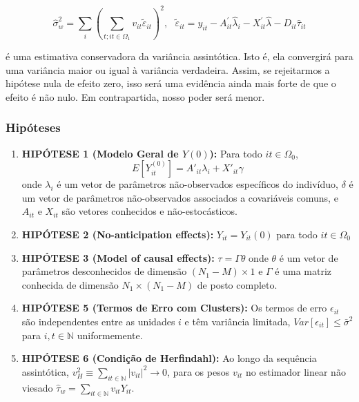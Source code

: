 \documentclass[portugues]{article}
\begin{document}
\begin{equation}\label{eq:var_borusyak}
    \hat{\sigma}_w^2 = \sum_{i} \left( \sum_{t;it \in \Omega_1} v_{it} \tilde{\varepsilon}_{it} \right)^2, \text{ } \tilde{\varepsilon}_{it} = y_{it} - A_{it}^\prime \hat{\lambda}_i - X_{it}^\prime \hat{\lambda} - D_{it} \hat{\tau}_{it}
\end{equation}

\noindent  é uma estimativa conservadora da variância assintótica. Isto é, ela convergirá para uma variância maior ou igual à variância verdadeira. Assim, se rejeitarmos a hipótese nula de efeito zero, isso será uma evidência ainda mais forte de que o efeito é não nulo. Em contrapartida, nosso poder será menor. 


\subsubsection{Hipóteses}

\begin{boxB}
    \begin{enumerate}

    \item \textbf{HIPÓTESE 1 (Modelo Geral de $Y(0)$):} Para todo $it \in \Omega_0$,
    $$E\left[Y_{it}^{(0)}\right] = A'_{it} \lambda_i + X'_{it} \gamma$$
    \noindent onde $\lambda_i$ é um vetor de parâmetros não-observados específicos do indivíduo, $\delta$ é um vetor de parâmetros não-observados associados a covariáveis comuns, e $A_{it}$ e $X_{it}$ são vetores conhecidos e não-estocásticos.

    \item \textbf{HIPÓTESE 2 (No-anticipation effects):} $Y_{it} = Y_{it}(0)$ para todo $it \in \Omega_0$

    \item \textbf{HIPÓTESE 3 (Model of causal effects):} $\tau = \Gamma\theta$ onde $\theta$ é um vetor de parâmetros desconhecidos de dimensão $(N_1 - M) \times 1$ e $\Gamma$ é uma matriz conhecida de dimensão $N_1 \times (N_1 - M)$ de posto completo.
   
    \item \textbf{HIPÓTESE 5 (Termos de Erro com Clusters):} Os termos de erro $\epsilon_{it}$ são independentes entre as unidades $i$ e têm variância limitada, $Var[\epsilon_{it}] \leq \bar{\sigma}^2$ para $i,t \in \mathbb{N}$ uniformemente.

    \item \textbf{HIPÓTESE 6 (Condição de Herfindahl):} Ao longo da sequência assintótica, $v^2_H \equiv \sum_{it \in \mathbb{N}} |v_{it}|^2 \rightarrow 0$, para os pesos $v_{it}$ no estimador linear não viesado $\hat{\tau}_w = \sum_{it \in \mathbb{N}} v_{it} Y_{it}$.

    \end{enumerate}
    \citep{borusyak2024revisiting}
\end{boxB}
\end{document}
